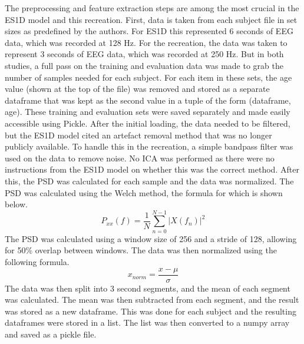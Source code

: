 The preprocessing and feature extraction steps are among the most crucial in the ES1D model and this recreation.
First, data is taken from each subject file in set sizes as predefined by the authors. For ES1D this represented 6 seconds of EEG data, which was recorded at 128 Hz.
For the recreation, the data was taken to represent 3 seconds of EEG data, which was recorded at 250 Hz.
But in both studies, a full pass on the training and evaluation data was made to grab the number of samples needed for each subject.
For each item in these sets, the age value (shown at the top of the file) was removed and stored as a separate dataframe that was kept as the second value in a tuple of the form (dataframe, age).
These training and evaluation sets were saved separately and made easily accessible using Pickle.
After the initial loading, the data needed to be filtered, but the ES1D model cited an artefact removal method that was no longer publicly available.
To handle this in the recreation, a simple bandpass filter was used on the data to remove noise. No ICA was performed as there were no instructions from the ES1D model on whether this was the correct method.
After this, the PSD was calculated for each sample and the data was normalized. The PSD was calculated using the Welch method, the formula for which is shown below.
\begin{equation}
    \label{eq:psd}
    P_{xx}(f) = \frac{1}{N} \sum_{n=0}^{N-1} |X(f_n)|^2
\end{equation}
The PSD was calculated using a window size of 256 and a stride of 128, allowing for 50\% overlap between windows.
The data was then normalized using the following formula.
\begin{equation}
    \label{eq:normalize}
    x_{norm} = \frac{x - \mu}{\sigma}
\end{equation}
The data was then split into 3 second segments, and the mean of each segment was calculated.
The mean was then subtracted from each segment, and the result was stored as a new dataframe.
This was done for each subject and the resulting dataframes were stored in a list.
The list was then converted to a numpy array and saved as a pickle file.

